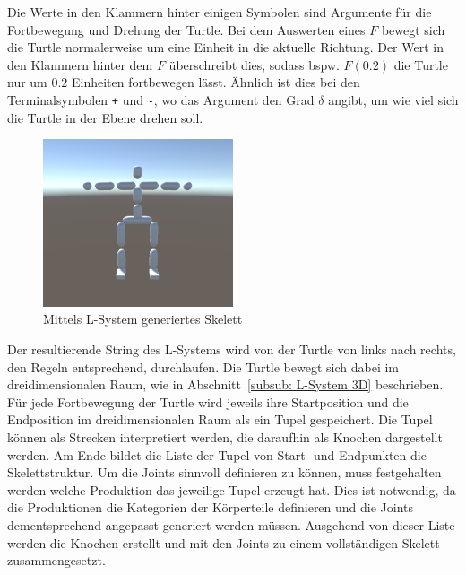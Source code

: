 Die Werte in den Klammern hinter einigen Symbolen sind Argumente für die Fortbewegung und Drehung der Turtle.
Bei dem Auswerten eines $F$ bewegt sich die Turtle normalerweise um eine Einheit in die aktuelle Richtung.
Der Wert in den Klammern hinter dem $F$ überschreibt dies, sodass bspw. $F(0.2)$ die Turtle nur um $0.2$ Einheiten fortbewegen lässt.
Ähnlich ist dies bei den Terminalsymbolen \texttt{+} und \texttt{-}, wo das Argument den Grad $\delta$ angibt, um wie viel sich die Turtle in der Ebene drehen soll.

\begin{figure}[h]
	\begin{center}
		\includegraphics[width = 0.5\textwidth]{resources/img/skeletonlsystemex.png}
	\end{center}
	\caption[L-System Kreatur]{Mittels L-System generiertes Skelett}
	\label{skeletonlsystemex}
\end{figure}

Der resultierende String des L-Systems wird von der Turtle von links nach rechts, den Regeln entsprechend, durchlaufen.
Die Turtle bewegt sich dabei im dreidimensionalen Raum, wie in Abschnitt~\ref{subsub: L-System 3D} beschrieben.
Für jede Fortbewegung der Turtle wird jeweils ihre Startposition und die Endposition im dreidimensionalen Raum als ein Tupel gespeichert.
Die Tupel können als Strecken interpretiert werden, die daraufhin als Knochen dargestellt werden.
Am Ende bildet die Liste der Tupel von Start- und Endpunkten die Skelettstruktur.
Um die Joints sinnvoll definieren zu können, muss festgehalten werden welche Produktion das jeweilige Tupel erzeugt hat.
Dies ist notwendig, da die Produktionen die Kategorien der Körperteile definieren und die Joints dementsprechend angepasst generiert werden müssen.
Ausgehend von dieser Liste werden die Knochen erstellt und mit den Joints zu einem vollständigen Skelett zusammengesetzt.

